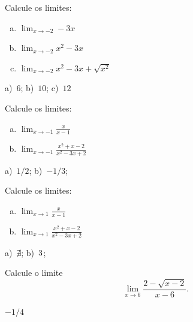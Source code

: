 \begin{exer}
  Calcule os limites:
  \begin{enumerate}[a)]
  \item $\displaystyle\lim_{x\to -2} -3x$\\
  \item $\displaystyle\lim_{x\to -2} x^2-3x$\\    
  \item $\displaystyle\lim_{x\to -2} x^2-3x+\sqrt{x^2}$\\    
  \end{enumerate}
\end{exer}
\begin{resp}
  a)~$6$; b)~$10$; c)~$12$
\end{resp}

\begin{exer}
  Calcule os limites:
  \begin{enumerate}[a)]
  \item $\displaystyle\lim_{x\to -1} \frac{x}{x-1}$\\
  \item $\displaystyle\lim_{x\to -1} \frac{x^2+x-2}{x^2-3x+2}$\\    
  \end{enumerate}
\end{exer}
\begin{resp}
  a)~$1/2$; b)~$-1/3$;
\end{resp}

\begin{exer}
  Calcule os limites:
  \begin{enumerate}[a)]
  \item $\displaystyle\lim_{x\to 1} \frac{x}{x-1}$\\
  \item $\displaystyle\lim_{x\to 1} \frac{x^2+x-2}{x^2-3x+2}$\\    
  \end{enumerate}
\end{exer}
\begin{resp}
  a)~$\nexists$; b)~$\-3$;
\end{resp}

\begin{exer}
  Calcule o limite
  \begin{equation}
    \lim_{x\to 6} \frac{2-\sqrt{x-2}}{x-6}.
  \end{equation}
\end{exer}
\begin{resp}
  $-1/4$
\end{resp}


